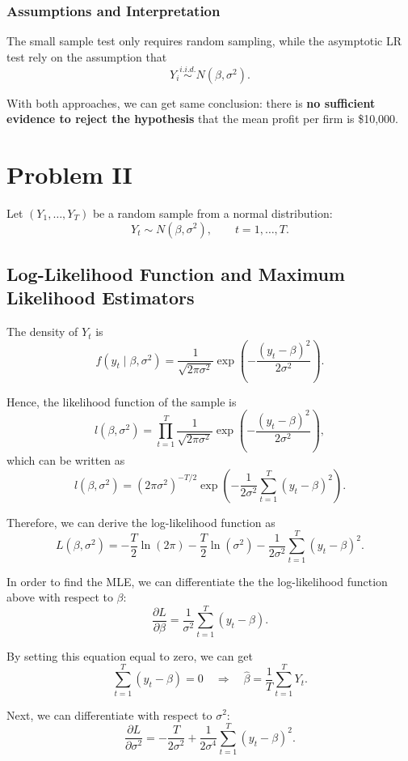 \documentclass[12pt]{article}
\begin{document}
\subsubsection{Assumptions and Interpretation}

The small sample test only requires random sampling, while
the asymptotic LR test rely on the assumption that
\[
Y_i \overset{i.i.d.}{\sim} N(\beta,\sigma^2).
\]



With both approaches, we can get same conclusion: there is \textbf{no sufficient evidence to reject the hypothesis} that the mean profit per firm is \$10,000. 

\section{Problem II}

Let \((Y_1,\dots,Y_T)\) be a random sample from a normal distribution:
\[
Y_t \sim N(\beta,\sigma^2),
\qquad t=1,\dots,T.
\]

\subsection{Log-Likelihood Function and Maximum Likelihood Estimators}

The density of \(Y_t\) is
\[
f(y_t\mid \beta,\sigma^2)
=
\frac{1}{\sqrt{2\pi\sigma^2}}
\exp\left(
-\frac{(y_t- \beta)^2}{2\sigma^2}
\right).
\]

Hence, the likelihood function of the sample is
\[
l(\beta,\sigma^2)
=
\prod_{t=1}^T
\frac{1}{\sqrt{2\pi\sigma^2}}
\exp\left(
-\frac{(y_t-\beta)^2}{2\sigma^2}
\right),
\]
which can be written as
\[
l(\beta,\sigma^2)
=
(2\pi\sigma^2)^{-T/2}
\exp\left(
-\frac{1}{2\sigma^2}\sum_{t=1}^T (y_t-\beta)^2
\right).
\]

Therefore, we can derive the log-likelihood function as
\[
L(\beta,\sigma^2)
=
-\frac{T}{2}\ln(2\pi)
-\frac{T}{2}\ln(\sigma^2)
-\frac{1}{2\sigma^2}\sum_{t=1}^T (y_t-\beta)^2.
\]

In order to find the MLE, we can differentiate the the log-likelihood function above with respect to \(\beta\):
\[
\frac{\partial L}{\partial \beta}
=
\frac{1}{\sigma^2}\sum_{t=1}^T (y_t-\beta).
\]

By setting this equation equal to zero, we can get
\[
\sum_{t=1}^T(y_t-\beta)=0
\quad \Rightarrow \quad
\hat \beta=\frac{1}{T}\sum_{t=1}^T Y_t.
\]

Next, we can differentiate with respect to \(\sigma^2\):
\[
\frac{\partial L}{\partial \sigma^2}
=
-\frac{T}{2\sigma^2}
+\frac{1}{2\sigma^4}\sum_{t=1}^T (y_t-\beta)^2.
\]
\end{document}
